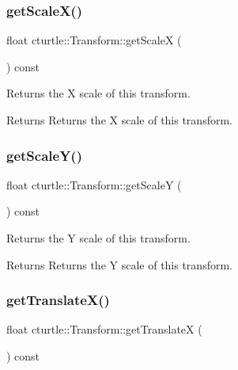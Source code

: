 \subsubsection{\texorpdfstring{get\+Scale\+X()}{getScaleX()}}
{\footnotesize\ttfamily float cturtle\+::\+Transform\+::get\+ScaleX (\begin{DoxyParamCaption}{ }\end{DoxyParamCaption}) const\hspace{0.3cm}{\ttfamily [inline]}}



Returns the X scale of this transform. 

\begin{DoxyReturn}{Returns}
Returns the X scale of this transform. 
\end{DoxyReturn}
\mbox{\label{classcturtle_1_1Transform_a7a47c8a4e32edfcccd871187dbd9680e}} 
\subsubsection{\texorpdfstring{get\+Scale\+Y()}{getScaleY()}}
{\footnotesize\ttfamily float cturtle\+::\+Transform\+::get\+ScaleY (\begin{DoxyParamCaption}{ }\end{DoxyParamCaption}) const\hspace{0.3cm}{\ttfamily [inline]}}



Returns the Y scale of this transform. 

\begin{DoxyReturn}{Returns}
Returns the Y scale of this transform. 
\end{DoxyReturn}
\mbox{\label{classcturtle_1_1Transform_a341b1f4fe0055d1c27d3cbea61ef3788}} 
\subsubsection{\texorpdfstring{get\+Translate\+X()}{getTranslateX()}}
{\footnotesize\ttfamily float cturtle\+::\+Transform\+::get\+TranslateX (\begin{DoxyParamCaption}{ }\end{DoxyParamCaption}) const\hspace{0.3cm}{\ttfamily [inline]}}



